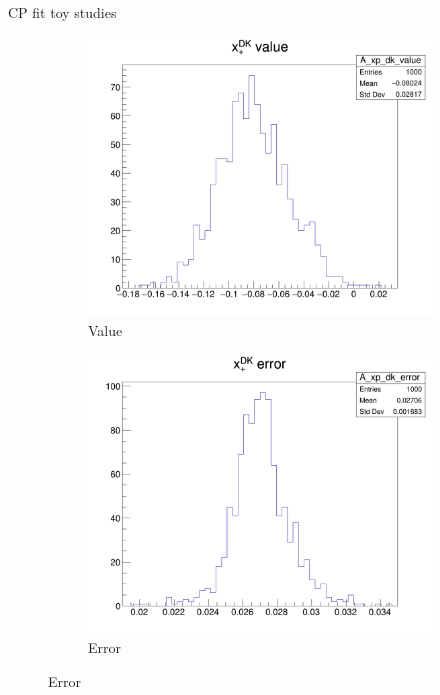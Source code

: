 \documentclass{beamer}
\begin{document}
\begin{frame}{CP fit toy studies}
  \begin{figure}
    \centering
    \begin{subfigure}{0.25\textwidth}
      \includegraphics[width = 1.0\textwidth]{Plots/A_xp_dk_value.png}
      \caption{Value}
    \end{subfigure}%
    \begin{subfigure}{0.25\textwidth}
      \includegraphics[width = 1.0\textwidth]{Plots/A_xp_dk_error.png}
      \caption{Error}
    \end{subfigure}%

\end{figure}
\end{frame}
\end{document}
